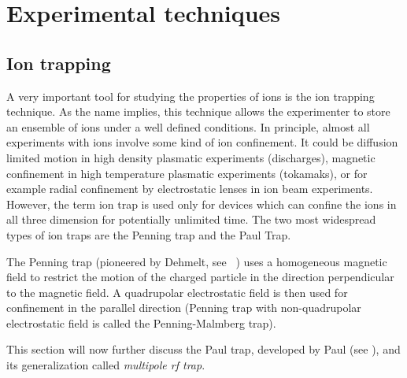 
\chapter{Experimental techniques}

\label{ch:Experimental}
\section{Ion trapping}
A very important tool for studying the properties of ions is the ion
trapping technique. As the name implies, this technique allows
the experimenter to store an ensemble of ions under a well defined
conditions. In principle, almost all experiments with ions involve
some kind of ion confinement. It could be diffusion limited motion
in high density plasmatic experiments (discharges), magnetic 
confinement in high temperature plasmatic experiments (tokamaks),
or for example radial confinement by electrostatic lenses in
ion beam experiments. However, the term ion trap is used only for
devices which can confine the ions in all three dimension for
potentially unlimited time. The two most widespread types of ion
traps are the Penning trap and the Paul Trap.

The Penning trap
(pioneered by Dehmelt, see \eg\, \cite{dehmelt1968})
uses a homogeneous magnetic field to restrict the motion of the
charged particle in the direction perpendicular to the magnetic field.
A quadrupolar electrostatic field is then used for confinement
in the parallel direction (Penning trap with non-quadrupolar
electrostatic field is called the Penning-Malmberg trap).

This section will now further discuss the Paul trap, developed
by Paul (see \cite{paul1990}), and its generalization called
{\em multipole rf trap}.

